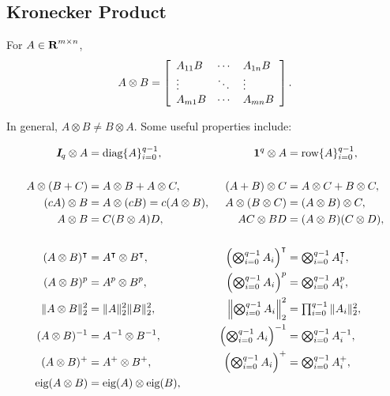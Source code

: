 \documentclass{article}
\begin{document}
\subsection{Kronecker Product}

    For $A\in\textbf{R}^{m\times n}$,
    \begin{align*}
        A\otimes B = \left[\begin{array}{lllllllllllllllllll} A_{11}B & \cdots & A_{1n}B
        \\
        \vdots & \ddots & \vdots
        \\
        A_{m1}B & \cdots & A_{mn}B\end{array}\right].
    \end{align*}

    In general, $A\otimes B \neq B\otimes A$. Some useful properties include:

    \begin{align*}
        \eye_q\otimes A &= \diag \{A\}_{i=0}^{q-1},&
        \ones^q\otimes A &= \row \{A\}_{i=0}^{q-1},\\\\
        A\otimes(B+C)&=A\otimes B + A\otimes C,&
        (A+B)\otimes C &= A\otimes C + B\otimes C,\\
        (cA)\otimes B & = A\otimes (cB) = c(A\otimes B), &
        A\otimes(B\otimes C) & = (A\otimes B) \otimes C,\\
        A\otimes B &= C(B\otimes A)D,&
        AC\otimes BD&=(A\otimes B)(C\otimes D),\\\\
        (A\otimes B)^\tp &= A^\tp\otimes B^\tp,&    
            \left(\textstyle\bigotimes_{i=0}^{q-1} A_i\right)^\tp
            &=\textstyle\bigotimes_{i=0}^{q-1} A_i^\tp,\\
        (A\otimes B)^p &= A^p\otimes B^p,&
            \left(\textstyle\bigotimes_{i=0}^{q-1} A_i\right)^p
            &=\textstyle\bigotimes_{i=0}^{q-1} A_i^p,\\
        \|A\otimes B\|_2^2&=\|A\|_2^2\|B\|_2^2,&    
            \left\|\textstyle\bigotimes_{i=0}^{q-1} A_i\right\|_2^2
            &=\textstyle\prod_{i=0}^{q-1} \|A_i\|_2^2,\\
        (A\otimes B)^{-1} &= A^{-1} \otimes B^{-1},&    
            \left(\textstyle\bigotimes_{i=0}^{q-1} A_i\right)^{-1}
            &=\textstyle\bigotimes_{i=0}^{q-1} A_i^{-1},\\
        (A\otimes B)^+ &= A^+ \otimes B^+,&    
            \left(\textstyle\bigotimes_{i=0}^{q-1} A_i\right)^+
            &=\textstyle\bigotimes_{i=0}^{q-1} A_i^+,\\
        \eig(A\otimes B)&=\eig(A)\otimes\eig(B),&    

\end{align*}
\end{document}
